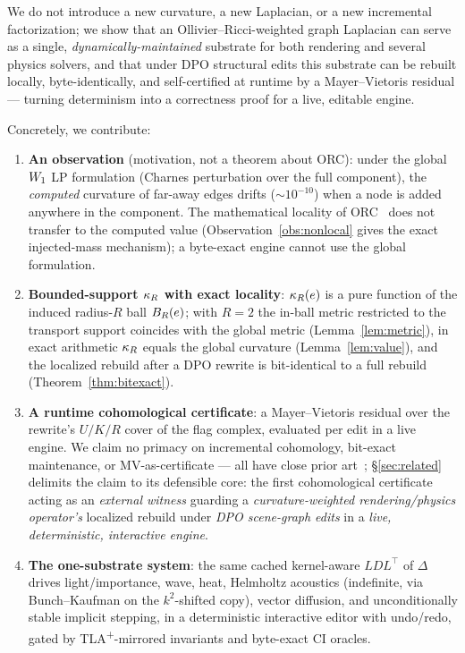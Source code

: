 We do not introduce a new curvature, a new Laplacian, or a new incremental
factorization; we show that an Ollivier--Ricci-weighted graph Laplacian can
serve as a single, \emph{dynamically-maintained} substrate for both rendering
and several physics solvers, and that under DPO structural edits this
substrate can be rebuilt locally, byte-identically, and self-certified at
runtime by a Mayer--Vietoris residual --- turning determinism into a
correctness proof for a live, editable engine.

Concretely, we contribute:
\begin{enumerate}
\item \textbf{An observation} (motivation, not a theorem about ORC): under
  the global $W_{1}$ LP formulation (Charnes perturbation over the full
  component), the \emph{computed} curvature of far-away edges drifts
  (${\sim}10^{-10}$) when a node is added anywhere in the component. The
  mathematical locality of ORC~\cite{jost2014ollivier} does not transfer to
  the computed value (Observation~\ref{obs:nonlocal} gives the exact
  injected-mass mechanism); a byte-exact engine cannot use the global
  formulation.
\item \textbf{Bounded-support $\kappa_R$ with exact locality}: $\kappa_R(e)$ is a pure
  function of the induced radius-$R$ ball $B_{R}(e)$; with $R{=}2$ the
  in-ball metric restricted to the transport support coincides with the
  global metric (Lemma~\ref{lem:metric}), in exact arithmetic $\kappa_R$ equals
  the global curvature (Lemma~\ref{lem:value}), and the localized rebuild
  after a DPO rewrite is bit-identical to a full rebuild
  (Theorem~\ref{thm:bitexact}).
\item \textbf{A runtime cohomological certificate}: a Mayer--Vietoris
  residual over the rewrite's $U/K/R$ cover of the flag complex, evaluated
  per edit in a live engine. We claim no primacy on incremental cohomology,
  bit-exact maintenance, or MV-as-certificate --- all have close prior
  art~\cite{volk2026incremental,young2026sheaf}; \S\ref{sec:related}
  delimits the claim to its defensible core: the first cohomological
  certificate acting as an \emph{external witness} guarding a
  \emph{curvature-weighted rendering/physics operator's} localized rebuild
  under \emph{DPO scene-graph edits} in a \emph{live, deterministic,
  interactive engine}.
\item \textbf{The one-substrate system}: the same cached kernel-aware
  $LDL^\top$ of $\Delta$ drives light/importance, wave, heat, Helmholtz
  acoustics (indefinite, via Bunch--Kaufman on the $k^2$-shifted copy),
  vector diffusion, and unconditionally stable implicit stepping, in a
  deterministic interactive editor with undo/redo, gated by
  TLA\textsuperscript{+}-mirrored invariants and byte-exact CI oracles.
\end{enumerate}

